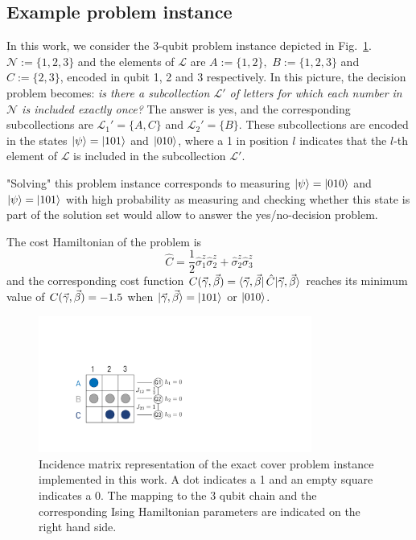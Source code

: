 \subsection{Example problem instance}
In this work, we consider the 3-qubit problem instance depicted in Fig.~\ref{fig:qaoa_exact_cover_matrix}.  $\mathcal{N} := \{1,2,3\}$ and the elements of $\mathcal{L}$ are $A := \{1,2\},\,\, B := \{1,2,3\}$ and $C := \{2,3\}$, encoded in qubit 1, 2 and 3 respectively. In this picture, the decision problem becomes: \textit{is there a subcollection $\mathcal{L}'$ of letters for which each number in $\mathcal{N}$ is included exactly once?} The answer is yes, and the corresponding subcollections are $\mathcal{L}_1' = \{A,C\}$ and $\mathcal{L}_2' = \{B\}$. These subcollections are encoded in the states $\ket{\psi}=\ket{101}$ and $\ket{010}$, where a 1 in position $l$ indicates that the $l$-th element of $\mathcal{L}$ is included in the subcollection $\mathcal{L'}$.

"Solving" this problem instance corresponds to measuring $\ket{\psi}=\ket{010}$ and $\ket{\psi}=\ket{101}$ with high probability as measuring and checking whether this state is part of the solution set would allow to answer the yes/no-decision problem.

The cost Hamiltonian of the problem is
\begin{equation}
    \hat C = \frac{1}{2}\hat\sigma_1^z\hat\sigma_2^z + \hat\sigma_2^z\hat\sigma_3^z
\end{equation}
and the corresponding cost function $C(\vec\gamma, \vec\beta) = \bra{\vec\gamma, \vec\beta} \hat C |\vec{\gamma}, \vec{\beta}\rangle{}$ reaches its minimum value of $C(\vec\gamma, \vec\beta) = -1.5$ when $|\vec{\gamma}, \vec{\beta}\rangle{} = \ket{101}$ or $\ket{010}$. 

\begin{figure}[t]
    \centering
    \includegraphics[width=0.8\textwidth, trim={11cm 8cm 38cm 13cm},clip]{chapters/qaoa/figs/exact_cover_matrix.pdf}
    \caption{Incidence matrix representation of the exact cover problem instance implemented in this work. A dot indicates a 1 and an empty square indicates a 0. The mapping to the 3 qubit chain and the corresponding Ising Hamiltonian parameters are indicated on the right hand side.}
    \label{fig:qaoa_exact_cover_matrix}
\end{figure}

